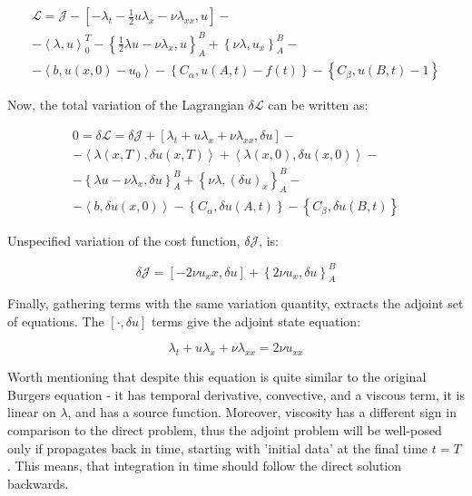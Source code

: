 \begin{subequations}
\label{eq:BurgEqAdj}
\begin{align}
    \label{eq:BurgEqAdj1}
    \mathcal{L} = \mathcal{J} - \left[ -\lambda_t - \frac{1}{2} u \lambda_x - \nu \lambda_{xx}, u \right] -\\
    - \left< \lambda, u \right>^T_0 - \left\{\frac{1}{2} \lambda u - \nu \lambda_x, u \right\}^B_A + \left\{ \nu \lambda, u_x \right\}^B_A - \\
    - \left< b, u(x,0) - u_0 \right> -  \left\{ C_{\alpha}, u(A,t) - f(t) \right\}  -  \left\{ C_{\beta}, u(B,t) - 1 \right\}
\end{align}
\end{subequations}

Now, the total variation of the Lagrangian $\delta \mathcal{L}$ can be written as:

\begin{subequations}
\begin{align}
    \label{eq:BurgEqAdjVariation}
    0 = \delta \mathcal{L} = \delta \mathcal{J} + \left[ \lambda_t + u \lambda_x + \nu \lambda_{xx}, \delta u \right] -\\
    - \left< \lambda(x,T), \delta u(x,T) \right> + \left< \lambda(x,0), \delta u(x,0) \right> - \\
    - \left\{ \lambda u - \nu \lambda_x, \delta u \right\}^B_A + \left\{ \nu \lambda, (\delta u)_x \right\}^B_A - \\
    - \left< b, \delta u(x,0) \right> -  \left\{ C_{\alpha}, \delta u(A,t) \right\}  -  \left\{ C_{\beta}, \delta u(B,t) \right\}
\end{align}
\end{subequations}

Unspecified variation of the cost function, $\delta \mathcal{J}$, is:

\begin{equation}
\delta \mathcal{J} = \left[ - 2 \nu u_xx, \delta u \right] + \left\{ 2 \nu u_x, \delta u  \right\}^B_A
\end{equation}

Finally, gathering terms with the same variation quantity, extracts the adjoint set of equations. The $\left[ \cdot , \delta u \right] $ terms give the adjoint state equation:

\begin{equation}
\lambda_t + u \lambda_x + \nu \lambda_{xx} = 2 \nu u_{xx}
\end{equation}

Worth mentioning that despite this equation is quite similar to the original Burgers equation - it has temporal derivative, convective, and a viscous term, it is linear on $\lambda$, and has a source function. Moreover, viscosity has a different sign in comparison to the direct problem, thus the adjoint problem will be well-posed only if propagates back in time, starting with 'initial data' at the final time $t = T$ \cite{Giles2000}. This means, that integration in time should follow the direct solution backwards.

